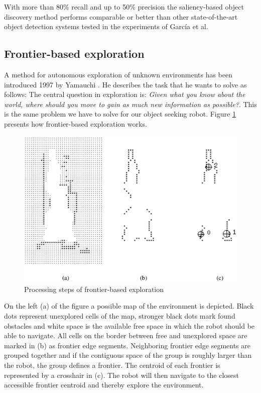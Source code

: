 \documentclass[a4paper,11pt,english]{article}
\begin{document}
With more than 80\% recall and up to 50\% precision the saliency-based object discovery method performs comparable or better than other state-of-the-art object detection systems tested in the experiments of García et al.

\subsection{Frontier-based exploration}
A method for autonomous exploration of unknown  environments has been introduced 1997 by Yamauchi \cite{yamauchi1997frontier}.
He describes the task that he wants to solve as follows: \glqq{}The central question in exploration is: \textit{Given what you know about the world, where should you move to gain as much  new  information  as  possible?}\grqq{}.
This is the same problem we have to solve for our object seeking robot.
Figure \ref{fig:frontier} presents how frontier-based exploration works.

\begin{figure}[h!]
	\begin{center}
		\includegraphics[width=1\textwidth]{src/frontier_exploration.png}
		\caption{ Processing steps of frontier-based exploration \cite{yamauchi1997frontier}}
		\label{fig:frontier}
	\end{center}
\end{figure}

On the left (a) of the figure a possible map of the environment is depicted. Black dots represent unexplored cells of the map, stronger black dots mark found obstacles and white space is the available free space in which the robot should be able to navigate.
All cells on the border between free and unexplored space are marked in (b) as frontier edge segments.
Neighboring frontier edge segments are grouped together and if the contiguous space of the group is roughly larger than the robot, the group defines a frontier. The centroid of each frontier is represented by a crosshair in (c).
The robot will then navigate to the closest accessible frontier centroid and thereby explore the environment.
\end{document}
